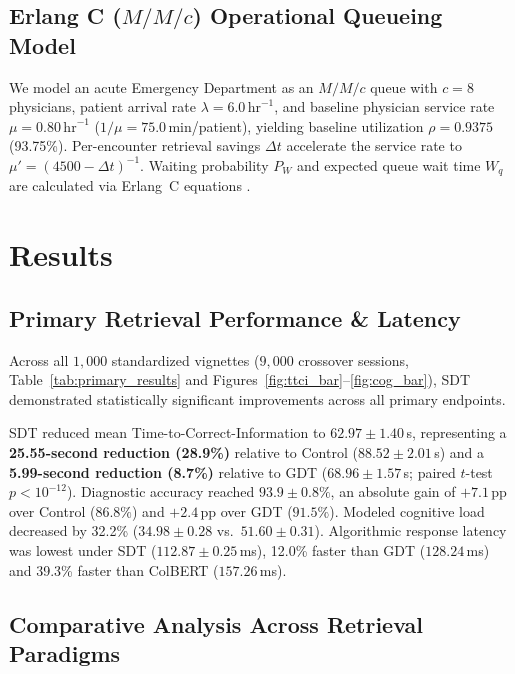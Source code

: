 \documentclass[12pt]{article}
\begin{document}
\subsection*{Erlang C ($M/M/c$) Operational Queueing Model}
We model an acute Emergency Department as an $M/M/c$ queue with $c = 8$ physicians, patient arrival rate $\lambda = 6.0\,\text{hr}^{-1}$, and baseline physician service rate $\mu = 0.80\,\text{hr}^{-1}$ ($1/\mu = 75.0$\,min/patient), yielding baseline utilization $\rho = 0.9375$ (93.75\%). Per-encounter retrieval savings $\Delta t$ accelerate the service rate to $\mu' = (4500 - \Delta t)^{-1}$. Waiting probability $P_W$ and expected queue wait time $W_q$ are calculated via Erlang~C equations \cite{erlang1917solution,kleinrock1975queueing}.

\section*{Results}

\subsection*{Primary Retrieval Performance \& Latency}

Across all $1{,}000$ standardized vignettes ($9{,}000$ crossover sessions, Table~\ref{tab:primary_results} and Figures~\ref{fig:ttci_bar}--\ref{fig:cog_bar}), SDT demonstrated statistically significant improvements across all primary endpoints. 

SDT reduced mean Time-to-Correct-Information to $62.97 \pm 1.40$\,s, representing a \textbf{25.55-second reduction (28.9\%)} relative to Control ($88.52 \pm 2.01$\,s) and a \textbf{5.99-second reduction (8.7\%)} relative to GDT ($68.96 \pm 1.57$\,s; paired $t$-test $p < 10^{-12}$). Diagnostic accuracy reached $93.9 \pm 0.8\%$, an absolute gain of $+7.1$\,pp over Control ($86.8\%$) and $+2.4$\,pp over GDT ($91.5\%$). Modeled cognitive load decreased by 32.2\% ($34.98 \pm 0.28$ vs.\ $51.60 \pm 0.31$). Algorithmic response latency was lowest under SDT ($112.87 \pm 0.25$\,ms), 12.0\% faster than GDT ($128.24$\,ms) and 39.3\% faster than ColBERT ($157.26$\,ms).

\subsection*{Comparative Analysis Across Retrieval Paradigms}
\end{document}

